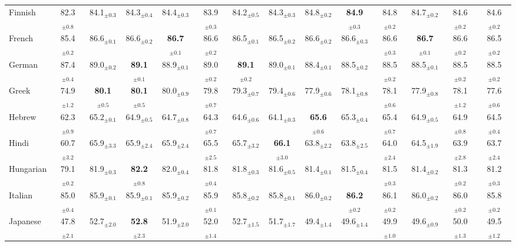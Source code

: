\begin{table*}[ht]
{\begin{tabular}{lccccccccccccc}
Finnish & 82.3$_{\pm 0.8}$ & 84.1$_{\pm 0.3}$ & 84.3$_{\pm 0.4}$ & 84.4$_{\pm 0.3}$ & 83.9$_{\pm 0.3}$ & 84.2$_{\pm 0.5}$ & 84.3$_{\pm 0.3}$ & 84.8$_{\pm 0.2}$ & \textbf{84.9}$_{\pm 0.3}$ & 84.8$_{\pm 0.2}$ & 84.7$_{\pm 0.2}$ & 84.6$_{\pm 0.2}$ & 84.6$_{\pm 0.2}$ \\
French & 85.4$_{\pm 0.2}$ & 86.6$_{\pm 0.1}$ & 86.6$_{\pm 0.2}$ & \textbf{86.7}$_{\pm 0.1}$ & 86.6$_{\pm 0.2}$ & 86.5$_{\pm 0.1}$ & 86.5$_{\pm 0.2}$ & 86.6$_{\pm 0.2}$ & 86.6$_{\pm 0.3}$ & 86.6$_{\pm 0.3}$ & \textbf{86.7}$_{\pm 0.1}$ & 86.6$_{\pm 0.2}$ & 86.5$_{\pm 0.2}$ \\
German & 87.4$_{\pm 0.4}$ & 89.0$_{\pm 0.2}$ & \textbf{89.1}$_{\pm 0.1}$ & 88.9$_{\pm 0.1}$ & 89.0$_{\pm 0.2}$ & \textbf{89.1}$_{\pm 0.2}$ & 89.0$_{\pm 0.1}$ & 88.4$_{\pm 0.1}$ & 88.5$_{\pm 0.2}$ & 88.5$_{\pm 0.2}$ & 88.5$_{\pm 0.1}$ & 88.5$_{\pm 0.2}$ & 88.5$_{\pm 0.2}$ \\
Greek & 74.9$_{\pm 1.2}$ & \textbf{80.1}$_{\pm 0.5}$ & \textbf{80.1}$_{\pm 0.5}$ & 80.0$_{\pm 0.9}$ & 79.8$_{\pm 0.7}$ & 79.3$_{\pm 0.7}$ & 79.4$_{\pm 0.6}$ & 77.9$_{\pm 0.6}$ & 78.1$_{\pm 0.8}$ & 78.1$_{\pm 0.6}$ & 77.9$_{\pm 0.8}$ & 78.1$_{\pm 1.2}$ & 77.6$_{\pm 0.6}$ \\
Hebrew & 62.3$_{\pm 0.9}$ & 65.2$_{\pm 0.1}$ & 64.9$_{\pm 0.5}$ & 64.7$_{\pm 0.8}$ & 64.3$_{\pm 0.7}$ & 64.6$_{\pm 0.6}$ & 64.1$_{\pm 0.3}$ & \textbf{65.6}$_{\pm 0.6}$ & 65.3$_{\pm 0.4}$ & 65.4$_{\pm 0.7}$ & 64.9$_{\pm 0.5}$ & 64.9$_{\pm 0.8}$ & 64.5$_{\pm 0.4}$ \\
Hindi & 60.7$_{\pm 3.2}$ & 65.9$_{\pm 3.3}$ & 65.9$_{\pm 2.4}$ & 65.9$_{\pm 2.4}$ & 65.5$_{\pm 2.5}$ & 65.7$_{\pm 3.2}$ & \textbf{66.1}$_{\pm 3.0}$ & 63.8$_{\pm 2.2}$ & 63.8$_{\pm 2.5}$ & 64.0$_{\pm 2.4}$ & 64.5$_{\pm 1.9}$ & 63.9$_{\pm 2.8}$ & 63.7$_{\pm 2.4}$ \\
Hungarian & 79.1$_{\pm 0.2}$ & 81.9$_{\pm 0.3}$ & \textbf{82.2}$_{\pm 0.8}$ & 82.0$_{\pm 0.4}$ & 81.8$_{\pm 0.4}$ & 81.8$_{\pm 0.3}$ & 81.6$_{\pm 0.5}$ & 81.4$_{\pm 0.1}$ & 81.5$_{\pm 0.4}$ & 81.5$_{\pm 0.3}$ & 81.4$_{\pm 0.2}$ & 81.3$_{\pm 0.2}$ & 81.2$_{\pm 0.3}$ \\
Italian & 85.0$_{\pm 0.4}$ & 85.9$_{\pm 0.1}$ & 85.9$_{\pm 0.1}$ & 85.9$_{\pm 0.2}$ & 85.9$_{\pm 0.1}$ & 85.8$_{\pm 0.2}$ & 85.8$_{\pm 0.1}$ & 86.0$_{\pm 0.2}$ & \textbf{86.2}$_{\pm 0.2}$ & 86.1$_{\pm 0.2}$ & 86.0$_{\pm 0.2}$ & 86.0$_{\pm 0.2}$ & 85.8$_{\pm 0.2}$ \\
Japanese & 47.8$_{\pm 2.1}$ & 52.7$_{\pm 2.0}$ & \textbf{52.8}$_{\pm 2.3}$ & 51.9$_{\pm 2.0}$ & 52.0$_{\pm 1.4}$ & 52.7$_{\pm 1.5}$ & 51.7$_{\pm 1.7}$ & 49.4$_{\pm 1.4}$ & 49.6$_{\pm 1.4}$ & 49.9$_{\pm 1.0}$ & 49.6$_{\pm 0.9}$ & 50.0$_{\pm 1.3}$ & 49.5$_{\pm 1.2}$ \\

\end{tabular}}
\end{table*}
